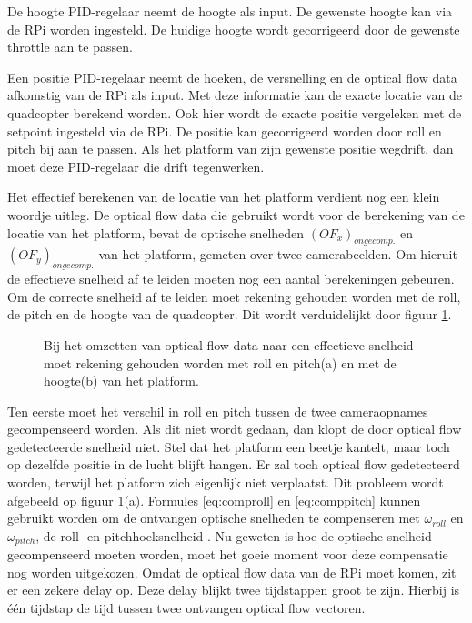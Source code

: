 \npar De hoogte PID-regelaar neemt de hoogte als input. De gewenste hoogte kan via de RPi worden ingesteld. De huidige hoogte wordt gecorrigeerd door de gewenste throttle aan te passen.

\npar Een positie PID-regelaar neemt de hoeken, de versnelling en de optical flow data afkomstig van de RPi als input. Met deze informatie kan de exacte locatie van de quadcopter berekend worden. Ook hier wordt de exacte positie vergeleken met de setpoint ingesteld via de RPi. De positie kan gecorrigeerd worden door roll en pitch bij aan te passen. Als het platform van zijn gewenste positie wegdrift, dan moet deze PID-regelaar die drift tegenwerken.

\npar Het effectief berekenen van de locatie van het platform verdient nog een klein woordje uitleg. De optical flow data die gebruikt wordt voor de berekening van de locatie van het platform, bevat de optische snelheden $(OF_x)_{ongecomp.}$ en $(OF_y)_{ongecomp.}$ van het platform, gemeten over twee camerabeelden. Om hieruit de effectieve snelheid af te leiden moeten nog een aantal berekeningen gebeuren. Om de correcte snelheid af te leiden moet rekening gehouden worden met de roll, de pitch en de hoogte van de quadcopter. Dit wordt verduidelijkt door figuur \ref{fig:invloed}.

\begin{figure}[h]
	\centering
	\hspace{0.01\linewidth}
	\caption{Bij het omzetten van optical flow data naar een effectieve snelheid moet rekening gehouden worden met roll en pitch(a) en met de hoogte(b) van het platform.} \label{fig:invloed}
\end{figure}

\npar Ten eerste moet het verschil in roll en pitch tussen de twee cameraopnames gecompenseerd worden. Als dit niet wordt gedaan, dan klopt de door optical flow gedetecteerde snelheid niet. Stel dat het platform een beetje kantelt, maar toch op dezelfde positie in de lucht blijft hangen. Er zal toch optical flow gedetecteerd worden, terwijl het platform zich eigenlijk niet verplaatst. Dit probleem wordt afgebeeld op figuur \ref{fig:invloed}(a). Formules \eqref{eq:comproll} en \eqref{eq:comppitch} kunnen gebruikt worden om de ontvangen optische snelheden te compenseren met $\omega_{roll}$ en $\omega_{pitch}$, de roll- en pitchhoeksnelheid \cite{thesis:wouter}. Nu geweten is hoe de optische snelheid gecompenseerd moeten worden, moet het goeie moment voor deze compensatie nog worden uitgekozen. Omdat de optical flow data van de RPi moet komen, zit er een zekere delay op. Deze delay blijkt twee tijdstappen groot te zijn. Hierbij is \'e\'en tijdstap de tijd tussen twee ontvangen optical flow vectoren.

